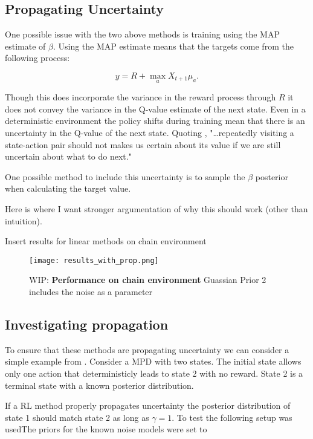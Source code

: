 \subsection{Propagating Uncertainty}

One possible issue with the two above methods is training using the MAP estimate of $\beta$. Using the MAP estimate means that the targets come from the following process:

$$
y = R + \max_a X_{t+1}\mu_a.
$$

Though this does incorporate the variance in the reward process through $R$ it does not convey the variance in the Q-value estimate of the next state. Even in a deterministic environment the policy shifts during training mean that there is an uncertainty in the Q-value of the next state. Quoting \cite{moerland_2017},  "\dots repeatedly visiting a state-action pair should not makes us certain about its value if we are still uncertain about what to do next."

One possible method to include this uncertainty is to sample the $\beta$ posterior when calculating the target value.

\todo Here is where I want stronger argumentation of why this should work (other than intuition).

\todo Insert results for linear methods on chain environment

\begin{figure}[H]
    \centering
    \texttt{[image: results\_with\_prop.png]}
    \caption{WIP: \textbf{Performance on chain environment} Guassian Prior 2 includes the noise as a parameter}
    \label{fig:results_no_propr}
\end{figure}

\subsection{Investigating propagation}

To ensure that these methods are propagating uncertainty we can consider a simple example from \cite{osband_2018}. Consider a MPD with two states. The initial state allows only one action that deterministicly leads to state 2 with no reward. State 2 is a terminal state with a known posterior distribution.

If a RL method properly propagates uncertainty the posterior distribution of state 1 should match state 2 as long as $\gamma=1$. To test the following setup was usedThe priors for the known noise models were set to

